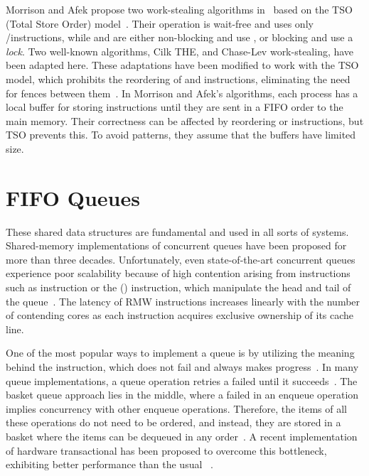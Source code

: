 Morrison and Afek propose two work-stealing algorithms in~\cite{fencefreeworkproceedings} based on the TSO (Total Store Order) model~\cite{DBLP_journals_cacm_SewellSONM10}. Their \Put{} operation is wait-free and uses only \R/\W instructions, while \Take{} and \Steal{} are either non-blocking and use \CAS, or blocking and use a \emph{lock}. Two well-known algorithms, Cilk THE, and Chase-Lev work-stealing, have been adapted here. These adaptations have been modified to work with the TSO model, which prohibits the reordering of \W and \R instructions, eliminating the need for fences between them~\cite{circular.work.stealing, DBLP_conf_pldi_FrigoLR98}. In Morrison and Afek's algorithms, each process has a local buffer for storing \W instructions until they are sent in a FIFO order to the main memory. Their correctness can be affected by reordering \W or \R instructions, but TSO prevents this. To avoid \RAW{} patterns, they assume that the \W buffers have limited size.


\section{\label{section:FIFO-queues}FIFO Queues}

These shared data structures are fundamental and used in all sorts of systems. Shared-memory implementations of concurrent queues have been proposed for more than three decades. Unfortunately, even state-of-the-art concurrent queues experience poor scalability because of high contention arising from \RMW{} instructions such as \CAS{} instruction or the (\FAI) instruction, which manipulate the head and tail of the queue~\cite{DBLP_conf_spaa_FatourouK11, DBLP_conf_ppopp_FatourouK12, basketqueue2007, DBLP_conf_ppopp_KoganP11, DBLP_journals_dc_Ladan-MozesS08, DBLP_conf_podc_MichaelS96, DBLP_journals_topc_Milman-SelaKLLP22, DBLP_conf_ppopp_YangM16}. The latency of RMW instructions increases linearly with the number of contending cores as each instruction acquires exclusive ownership of its cache line.

One of the most popular ways to implement a queue is by utilizing the meaning behind the \FAI{} instruction, which does not fail and always makes progress~\cite{ppopp2013x86queues, DBLP_conf_ppopp_YangM16}. In many queue implementations, a queue operation retries a failed \CAS{} until it succeeds~\cite{DBLP_conf_spaa_FatourouK11, DBLP_conf_ppopp_FatourouK12, basketqueue2007, DBLP_conf_ppopp_KoganP11, DBLP_journals_dc_Ladan-MozesS08, DBLP_conf_ppopp_YangM16}. The basket queue approach lies in the middle, where a failed \CAS{} in an enqueue operation implies concurrency with other enqueue operations. Therefore, the items of all these operations do not need to be ordered, and instead, they are stored in a basket where the items can be dequeued in any order~\cite{basketqueue2007}. A recent implementation of hardware transactional \CAS{} has been proposed to overcome this bottleneck, exhibiting better performance than the usual \CAS~\cite{scalingconcurrent2020}.

